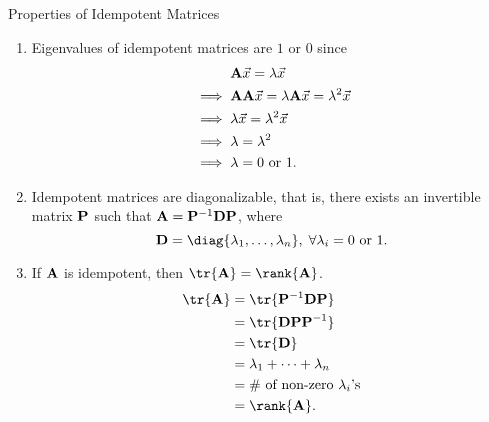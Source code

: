 \begin{Remark}{Properties of Idempotent Matrices}{}
    \begin{enumerate}[(1)]
        \item Eigenvalues of idempotent matrices are $ 1 $ or $ 0 $ since
              \begin{align*}
                   & \phantom{{}\implies{}}\Matrix{A}\Vector{x}=\lambda \Vector{x}                   \\
                   & \implies \Matrix{AA}\Vector{x}=\lambda\Matrix{A}\Vector{x}=\lambda^2 \Vector{x} \\
                   & \implies \lambda \Vector{x}=\lambda^2 \Vector{x}                                \\
                   & \implies \lambda=\lambda^2                                                      \\
                   & \implies \lambda=0\text{ or }1.
              \end{align*}
        \item Idempotent matrices are diagonalizable, that is, there exists an invertible matrix $ \mathbf{P} $ such that
              $ \mathbf{A}=\mathbf{P}^{-1}\mathbf{D}\mathbf{P} $, where
              \[ \Matrix{D}=\diag{\lambda_1,\ldots,\lambda_n},\; \forall \lambda_i=0\text{ or }1. \]
        \item If $ \mathbf{A} $ is idempotent, then $ \tr{\Matrix{A}}=\rank{\Matrix{A}} $.
              \begin{align*}
                  \tr{\Matrix{A}}
                   & =\tr{\Matrix{P}^{-1}\Matrix{D}\Matrix{P}} \\
                   & =\tr{\Matrix{D}\Matrix{PP}^{-1}}          \\
                   & =\tr{\Matrix{D}}                          \\
                   & =\lambda_1+\cdots+\lambda_n               \\
                   & =\text{\# of non-zero $ \lambda_i $'s}    \\
                   & =\rank{\Matrix{A}}.
              \end{align*}
    \end{enumerate}
\end{Remark}
